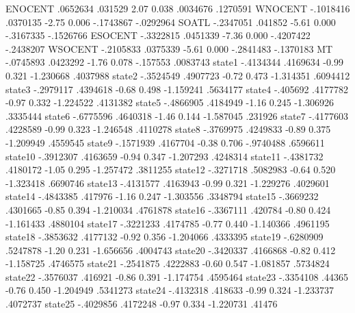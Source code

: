      ENOCENT {\VBAR}   .0652634    .031529     2.07   0.038     .0034676    .1270591
     WNOCENT {\VBAR}  -.1018416   .0370135    -2.75   0.006    -.1743867   -.0292964
       SOATL {\VBAR}  -.2347051    .041852    -5.61   0.000    -.3167335   -.1526766
     ESOCENT {\VBAR}  -.3322815   .0451339    -7.36   0.000    -.4207422   -.2438207
     WSOCENT {\VBAR}  -.2105833   .0375339    -5.61   0.000    -.2841483   -.1370183
          MT {\VBAR}  -.0745893   .0423292    -1.76   0.078     -.157553    .0083743
      state1 {\VBAR}  -.4134344   .4169634    -0.99   0.321    -1.230668    .4037988
      state2 {\VBAR}  -.3524549   .4907723    -0.72   0.473    -1.314351    .6094412
      state3 {\VBAR}  -.2979117   .4394618    -0.68   0.498    -1.159241    .5634177
      state4 {\VBAR}   -.405692   .4177782    -0.97   0.332    -1.224522    .4131382
      state5 {\VBAR}  -.4866905   .4184949    -1.16   0.245    -1.306926    .3335444
      state6 {\VBAR}  -.6775596   .4640318    -1.46   0.144    -1.587045     .231926
      state7 {\VBAR}  -.4177603   .4228589    -0.99   0.323    -1.246548    .4110278
      state8 {\VBAR}  -.3769975   .4249833    -0.89   0.375    -1.209949    .4559545
      state9 {\VBAR}  -.1571939   .4167704    -0.38   0.706    -.9740488    .6596611
     state10 {\VBAR}  -.3912307   .4163659    -0.94   0.347    -1.207293    .4248314
     state11 {\VBAR}  -.4381732   .4180172    -1.05   0.295    -1.257472    .3811255
     state12 {\VBAR}  -.3271718   .5082983    -0.64   0.520    -1.323418    .6690746
     state13 {\VBAR}  -.4131577   .4163943    -0.99   0.321    -1.229276    .4029601
     state14 {\VBAR}  -.4843385    .417976    -1.16   0.247    -1.303556    .3348794
     state15 {\VBAR}  -.3669232   .4301665    -0.85   0.394    -1.210034    .4761878
     state16 {\VBAR}  -.3367111    .420784    -0.80   0.424    -1.161433    .4880104
     state17 {\VBAR}  -.3221233   .4174785    -0.77   0.440    -1.140366    .4961195
     state18 {\VBAR}  -.3853632   .4177132    -0.92   0.356    -1.204066    .4333395
     state19 {\VBAR}  -.6280909   .5247878    -1.20   0.231    -1.656656    .4004743
     state20 {\VBAR}  -.3420337   .4166868    -0.82   0.412    -1.158725    .4746575
     state21 {\VBAR}  -.2541875   .4222883    -0.60   0.547    -1.081857    .5734824
     state22 {\VBAR}  -.3576037    .416921    -0.86   0.391    -1.174754    .4595464
     state23 {\VBAR}  -.3354108     .44365    -0.76   0.450    -1.204949    .5341273
     state24 {\VBAR}  -.4132318    .418633    -0.99   0.324    -1.233737    .4072737
     state25 {\VBAR}  -.4029856   .4172248    -0.97   0.334    -1.220731      .41476
